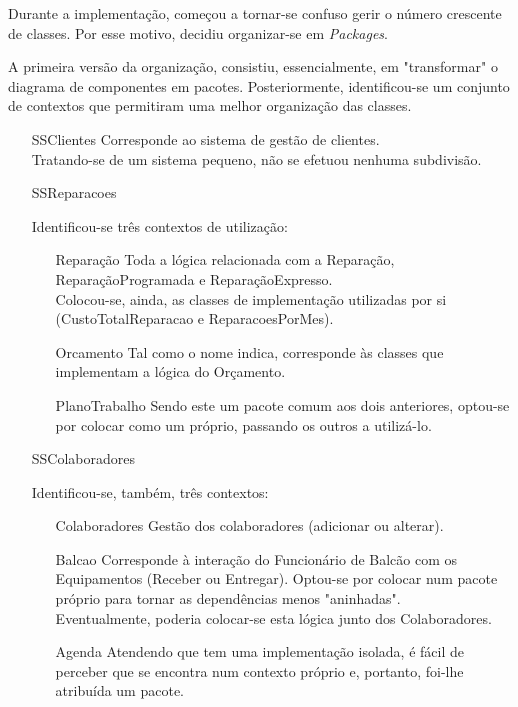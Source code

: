 \documentclass[../relatorio.tex]{subfiles}
\begin{document}
Durante a implementação, começou a tornar-se confuso gerir
o número crescente de classes.
Por esse motivo, decidiu organizar-se em \textit{Packages}.

A primeira versão da organização, consistiu, essencialmente,
em "transformar" o diagrama de componentes em pacotes.
Posteriormente, identificou-se um conjunto de contextos que permitiram uma melhor organização
das classes.

\begin{itemize}
    \item[SSClientes] {
          Corresponde ao sistema de gestão de clientes.\\
          Tratando-se de um sistema pequeno, não se efetuou nenhuma subdivisão.
          }
    \item[SSReparacoes] {
          Identificou-se três contextos de utilização:
          \begin{itemize}
              \item[Reparação]{
                    Toda a lógica relacionada com a Reparação, ReparaçãoProgramada e ReparaçãoExpresso.\\
                    Colocou-se, ainda, as classes de implementação utilizadas por si (CustoTotalReparacao e
                    ReparacoesPorMes).
                    }
              \item[Orcamento]{
                    Tal como o nome indica, corresponde às classes que implementam a lógica do Orçamento.
                    }
              \item[PlanoTrabalho] {
                    Sendo este um pacote comum aos dois anteriores, optou-se por colocar como um próprio,
                    passando os outros a utilizá-lo.
                    }
          \end{itemize}
          }
    \item[SSColaboradores] {
          Identificou-se, também, três contextos:
          \begin{itemize}
              \item[Colaboradores] {
                    Gestão dos colaboradores (adicionar ou alterar).
                    }
              \item[Balcao]{
                    Corresponde à interação do Funcionário de Balcão com os Equipamentos
                    (Receber ou Entregar).
                    Optou-se por colocar num pacote próprio para tornar as dependências menos
                    "aninhadas".\\
                    Eventualmente, poderia colocar-se esta lógica junto dos Colaboradores.
                    }
              \item[Agenda] {
                    Atendendo que tem uma implementação isolada, é fácil de perceber que
                    se encontra num contexto próprio e, portanto, foi-lhe atribuída um
                    pacote.
                    }
          \end{itemize}
          }
\end{itemize}
\end{document}
